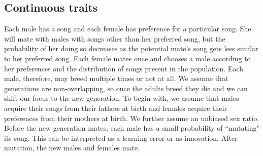 \documentclass{article}\usepackage[]{graphicx}\usepackage[]{color}
\begin{document}
\subsection{Continuous traits }

Each male has a song and each female has preference for a particular song. She will mate with males with songs other than her preferred song, but the probability of her doing so decreases as the potential mate's song gets less similar to her preferred song. Each female mates once and chooses a male according to her preferences and the distribution of songs present in the population. Each male, therefore, may breed multiple times or not at all. We assume that generations are non-overlapping, so once the adults breed they die and we can shift our focus to the new generation. To begin with, we assume that males acquire their songs from their fathers at birth and females acquire their preferences from their mothers at birth. We further assume an unbiased sex ratio. Before the new generation mates, each male has a small probability of ``mutating" its song. This can be interpreted as a learning error or as innovation. After mutation, the new males and females mate. 
\end{document}
